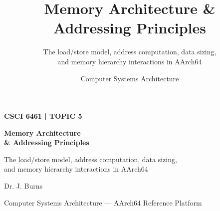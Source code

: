 \documentclass[aspectratio=169,11pt,t]{beamer}
\title[Topic 5]{
  Memory Architecture \& Addressing Principles
}
\subtitle{
  The load/store model, address computation, data sizing,\\
  and memory hierarchy interactions in AArch64
}
\author{
  Computer Systems Architecture
}
\date{}
\begin{document}

\begin{frame}[plain]

\vspace{0.8cm}
\begin{minipage}{0.88\textwidth}
{\color{gold}\normalsize\bfseries CSCI 6461 \;|\; TOPIC 5\par}
\vspace{0.25cm}
{\color{white}\fontsize{24}{28}\selectfont\bfseries
 Memory Architecture\\[0.08cm]
 \& Addressing Principles
\par}
\vspace{0.35cm}
{\color{white!80}\large
 The load/store model, address computation, data sizing,\\
 and memory hierarchy interactions in AArch64
\par}
\end{minipage}

\vfill
{\color{white}\normalsize Dr. J. Burns\par}
{\color{white!70}\small Computer Systems Architecture --- AArch64 Reference Platform\par}
\vspace{0.35cm}
\end{frame}

\end{document}
